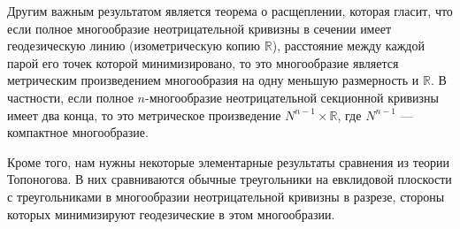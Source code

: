 Другим важным результатом является теорема о расщеплении, которая гласит, что если полное 
многообразие неотрицательной кривизны в сечении имеет геодезическую линию (изометрическую копию 
$\mathbb{R}$), расстояние между каждой парой его точек которой минимизировано, то это многообразие 
является метрическим произведением многообразия на одну меньшую размерность и $\mathbb{R}$. В частности, если 
полное $n$-многообразие неотрицательной секционной кривизны имеет два конца, то это 
метрическое произведение $N^{n-1} \times \mathbb{R}$, где $N^{n-1}$ — компактное многообразие.

Кроме того, нам нужны некоторые элементарные результаты сравнения из теории Топоногова. 
В них сравниваются обычные треугольники на евклидовой плоскости с треугольниками в многообразии 
неотрицательной кривизны в разрезе, стороны которых минимизируют геодезические в этом 
многообразии.\\

